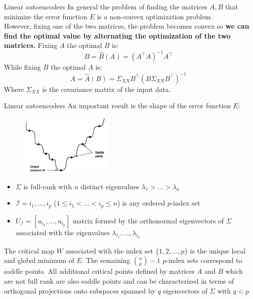 \documentclass[9pt]{beamer}
\begin{document}
\begin{frame}{Linear autoencoders}
    In general the problem of finding the matrices $A,B$ that minimize the error function $E$ is a non-convex optimization problem.\\
    \vspace{0.3cm}
    However, fixing one of the two matrices, the problem becomes convex so \textbf{we can find the optimal value by alternating the optimization of the two matrices.}
    Fixing $A$ the optimal $B$ is: 
    \[
        B = \hat{B}(A) = (A^\intercal A)^{-1} A^\intercal 
    \]
    While fixing $B$ the optimal $A$ is:
    \[
        A = \hat{A}(B) = \Sigma_{XX}B^\intercal (B\Sigma_{XX}B^\intercal)^{-1}
    \]
    Where $\Sigma_{XX}$ is the covariance matrix of the input data.
\end{frame}

\begin{frame}{Linear autoencoders}
    An important result is the shape of the error function $E$:
    \begin{multicols}{2}
        \begin{center}
            \begin{figure}[H]
                \centering
                \includegraphics[width=0.4\textwidth]{./Images/LinearAutoenc_Saddles.png}
            \end{figure}
        \end{center}
        \newcolumn
        \begin{itemize}
            \item $\Sigma$ is full-rank with $n$ distinct eigenvalues $\lambda_1 > \dots > \lambda_n$
            \item $\mathcal{I} = {i_1, \dots, i_p}$ ($1 \leq i_1 < \dots < i_p \leq n$) is any ordered $p$-index set
            \item $U_{\mathcal{I}} = [ u_{i_1}, \dots, u_{i_p} ]$ matrix formed by the orthonormal eigenvectors of $\Sigma$ associated with the eigenvalues $\lambda_{i_1}, \dots, \lambda_{i_p}$
        \end{itemize}
    \end{multicols}
The critical map $W$ associated with the index set $\{1,2,\dots, p\}$ is the unique local and global minimum of $E$. The remaining $\binom{n}{p} - 1$ $p$-index sets correspond to saddle points. All additional critical points defined by matrices $A$ and $B$ which are not full rank are also saddle points and can be characterized in terms of orthogonal projections onto subspaces spanned by $q$ eigenvectors of $\Sigma$ with $q < p$
\end{frame}
\end{document}
